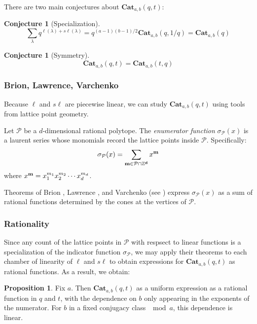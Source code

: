 \documentclass{amsart}[12pt]
\theoremstyle{definition}
\newtheorem{proposition}[dummy]{Proposition}
\newtheorem{conjecture}[dummy]{Conjecture}
\newcommand{\Z}{\mathbb{Z}}
\newcommand{\Cat}{\mathbf{Cat}}
\newcommand{\sk}{s\ell}
\begin{document}
There are two main conjectures about $\Cat_{a,b}(q,t)$:

\begin{conjecture}[Specialization]
$$\sum_{\lambda} q^{\ell(\lambda)+\sk(\lambda)}=q^{(a-1)(b-1)/2}\Cat_{a,b}(q,1/q)=\Cat_{a,b}(q)$$
\end{conjecture}

\begin{conjecture}[Symmetry]
$$\Cat_{a,b}(q,t)=\Cat_{a,b}(t,q)$$
\end{conjecture}


\subsubsection{Brion, Lawrence, Varchenko}

Because $\ell$ and $\sk$ are piecewise linear, we can study $\Cat_{a,b}(q,t)$ using tools from lattice point geometry.

Let $\mathcal{P}$ be a $d$-dimensional rational polytope.  The \emph{enumerator function} $\sigma_{\mathcal{P}}(x)$ is a laurent series whose monomials record the lattice points inside $\mathcal{P}$.  Specifically:
$$\sigma_{\mathcal{P}}(x)=\sum_{\bf{m}\in \mathcal{P}\cap \Z^d}x^{\bf{m}}$$
where $x^{\bf{m}}=x_1^{m_1}x_2^{m_2}\cdots x_d^{m_d}$. 

Theorems of Brion \cite{Brion}, Lawrence \cite{Lawrence}, and Varchenko \cite{Varchenko} (see \cite{BHS}) express $\sigma_{\mathcal{P}}(x)$ as a sum of rational functions determined by the cones at the vertices of $\mathcal{P}$.   


\subsubsection{Rationality}

Since any count of the lattice points in $\mathcal{P}$ with respsect to linear functions is a specialization of the indicator function $\sigma_{\mathcal{P}}$, we may apply their theorems to each chamber of linearity of $\ell$ and $\sk$ to obtain expressions for $\Cat_{a,b}(q,t)$ as rational functions.  As a result, we obtain:

\begin{proposition}
Fix $a$.  Then $\Cat_{a,b}(q,t)$ as a uniform expression as a rational function in $q$ and $t$, with the dependence on $b$ only appearing in the exponents of the numerator.  For $b$ in a fixed conjugacy class $\mod a$, this dependence is linear.
\end{proposition}
\end{document}
